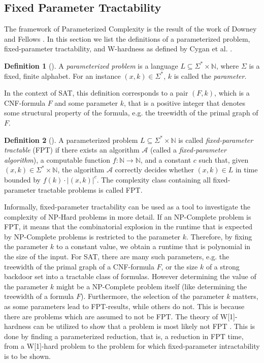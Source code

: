 \documentclass[11pt,a4paper]{article}
\theoremstyle{definition}
\newtheorem{definition}{Definition}[section]
\begin{document}

\subsection{Fixed Parameter Tractability}
The framework of Parameterized Complexity is the result of the work of Downey and Fellows \cite{downeyFellows}. In this section we list the definitions of a parameterized problem, fixed-parameter tractability, and W-hardness as defined by Cygan et al. \cite{}.
\begin{definition}[{\cite[Chapter 1, p.12]{Cygan2015}}]
A \textit{parameterized problem} is a language $L \subseteq \Sigma^* \times \mathbb{N}$, where $\Sigma$ is a fixed, finite alphabet. For an instance $(x,k) \in \Sigma^*$, $k$ is called the \textit{parameter}.
\end{definition}
In the context of SAT, this definition corresponds to a pair $(F, k)$, which is a CNF-formula $F$ and some parameter $k$, that is a positive integer that denotes some structural property of the formula, e.g. the treewidth of the primal graph of $F$. 
\begin{definition}[{\cite[Chapter 1, p.13]{Cygan2015}}]
A parameterized problem $L \subseteq \Sigma^* \times \mathbb{N}$ is called \textit{fixed-parameter tractable} (FPT) if there exists an algorithm $\mathcal{A}$ (called a \textit{fixed-parameter algorithm}), a computable function $f : \mathbb{N} \to \mathbb{N}$, and a constant $c$ such that, given $(x,k) \in \Sigma^* \times \mathbb{N}$, the algorithm $\mathcal{A}$ correctly decides whether $(x,k) \in L$ in time bounded by $f(k) \cdot |(x,k)|^c$. The complexity class containing all fixed-parameter tractable problems is called FPT. 
\end{definition}
Informally, fixed-parameter tractability can be used as a tool to investigate the complexity of NP-Hard problems in more detail. If an NP-Complete problem is FPT, it means that the combinatorial explosion in the runtime that is expected by NP-Complete problems is restricted to the parameter $k$. Therefore, by fixing the parameter $k$ to a constant value, we obtain a runtime that is polynomial in the size of the input. For SAT, there are many such parameters, e.g. the treewidth of the primal graph of a CNF-formula $F$, or the size $k$ of a strong backdoor set into a tractable class of formulas. However determining the value of the parameter $k$ might be a NP-Complete problem itself (like determining the treewidth of a formula $F$). Furthermore, the selection of the parameter $k$ matters, as some parameters lead to FPT-results, while others do not. This is because there are problems which are assumed to not be FPT. The theory of W[1]-hardness can be utilized to show that a problem is most likely not FPT \cite[Chapter 13]{Cygan2015}. This is done by finding a parameterized reduction, that is, a reduction in FPT time, from a W[1]-hard problem to the problem for which fixed-parameter intractability is to be shown. 
\end{document}

